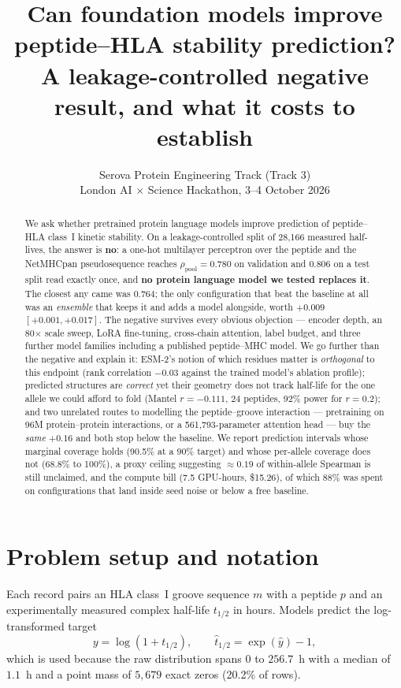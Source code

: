 \documentclass[11pt,a4paper]{article}
\title{\vspace{-1.6em}\textbf{Can foundation models improve peptide--HLA stability prediction?}\\
\large A leakage-controlled negative result, and what it costs to establish}
\author{Serova Protein Engineering Track (Track 3) \\ London AI $\times$ Science Hackathon, 3--4 October 2026}
\date{}
\newcommand{\rhop}{\rho_{\text{pool}}}
\begin{document}
\maketitle
\vspace{-2.2em}

\begin{abstract}
\noindent
We ask whether pretrained protein language models improve prediction of peptide--HLA class~I
kinetic stability. On a leakage-controlled split of 28{,}166 measured half-lives, the answer is
\textbf{no}: a one-hot multilayer perceptron over the peptide and the NetMHCpan pseudosequence
reaches $\rhop = 0.780$ on validation and $0.806$ on a test split read exactly once, and
\textbf{no protein language model we tested replaces it}. The closest any came was $0.764$; the
only configuration that beat the baseline at all was an \emph{ensemble} that keeps it and adds a
model alongside, worth $+0.009$ $[+0.001, +0.017]$. The negative survives every obvious objection
--- encoder depth, an 80$\times$ scale sweep, LoRA fine-tuning, cross-chain attention, label
budget, and three further model families including a published peptide--MHC model. We go further
than the negative and explain it: ESM-2's notion of which residues matter is \emph{orthogonal} to
this endpoint (rank correlation $-0.03$ against the trained model's ablation profile); predicted
structures are \emph{correct} yet their geometry does not track half-life for the one allele we
could afford to fold (Mantel $r=-0.111$, 24 peptides, 92\% power for $r=0.2$); and two unrelated
routes to modelling the peptide--groove interaction --- pretraining on 96M protein--protein
interactions, or a 561{,}793-parameter attention head --- buy the \emph{same} $+0.16$ and both
stop below the baseline. We report prediction intervals whose marginal coverage holds (90.5\% at
a 90\% target) and whose per-allele coverage does not (68.8\% to 100\%), a proxy ceiling
suggesting $\approx 0.19$ of within-allele Spearman is still unclaimed, and the compute bill
(7.5 GPU-hours, \$15.26), of which 88\% was spent on configurations that land inside seed noise
or below a free baseline.
\end{abstract}

\section{Problem setup and notation}

Each record pairs an HLA class~I groove sequence $m$ with a peptide $p$ and an experimentally
measured complex half-life $t_{1/2}$ in hours. Models predict the log-transformed target
\[
y=\log\!\left(1+t_{1/2}\right),\qquad \hat t_{1/2}=\exp(\hat y)-1,
\]
which is used because the raw distribution spans $0$ to $256.7$~h with a median of $1.1$~h and a
point mass of $5{,}679$ exact zeros (20.2\% of rows).
\end{document}
